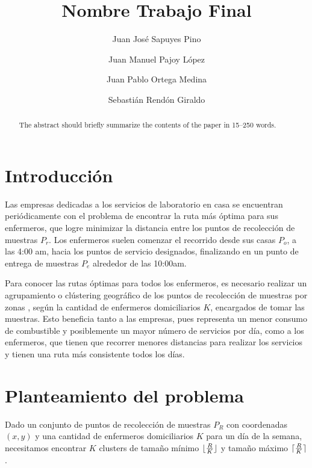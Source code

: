\documentclass[runningheads]{llncs}
\DeclarePairedDelimiter{\ceil}{\lceil}{\rceil}
\DeclarePairedDelimiter{\floor}{\lfloor}{\rfloor}
\begin{document}
%
\title{Nombre Trabajo Final}
%
%
\author{Juan José Sapuyes Pino \and
    Juan Manuel Pajoy López \and
    Juan Pablo Ortega Medina \and
    Sebastián Rendón Giraldo}
%
\authorrunning{}
%
%
\maketitle              %
%
\begin{abstract}
    The abstract should briefly summarize the contents of the paper in
    15--250 words.

\end{abstract}

\section{Introducción}
Las empresas dedicadas a los servicios de laboratorio en casa se encuentran
periódicamente con el problema de encontrar la ruta más óptima para sus enfermeros,
que logre minimizar la distancia entre los puntos de recolección de muestras
$P_{r}$. Los enfermeros suelen comenzar el recorrido desde sus casas $P_{o}$,
a las 4:00 am, hacia los puntos de servicio designados, finalizando en un
punto de entrega de muestras $P_{e}$ alrededor de las 10:00am.

Para conocer las rutas óptimas para todos los enfermeros, es necesario realizar
un agrupamiento o clústering geográfico de los puntos de recolección de muestras
por zonas \cite{bard11}, según la cantidad de enfermeros domiciliarios $K$,
encargados de tomar las muestras. Esto beneficia tanto a las empresas,
pues representa un menor consumo de combustible y posiblemente un mayor número
de servicios por día, como a los enfermeros, que tienen que recorrer menores
distancias para realizar los servicios y tienen una ruta más consistente todos
los días.

\section{Planteamiento del problema}
Dado un conjunto de puntos de recolección de muestras $P_{R}$ con coordenadas
$(x, y)$ y una cantidad de enfermeros domiciliarios $K$ para un día de la semana,
necesitamos encontrar $K$ clusters de tamaño mínimo $\floor{\frac{R}{K}}$ y tamaño
máximo $\ceil{\frac{R}{K}}$.
\end{document}
